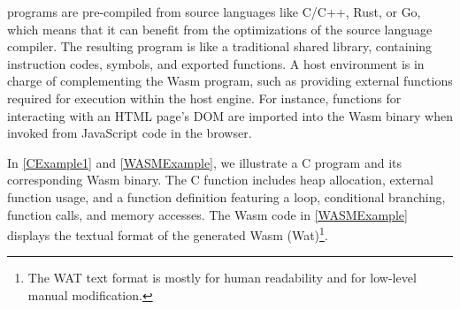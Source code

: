 

\Wasm programs are pre-compiled from source languages like C/C++, Rust, or Go, which means that it can benefit from the optimizations of the source language compiler.
The resulting \wasm program is like a traditional shared library, containing instruction codes, symbols, and exported functions. 
A host environment is in charge of complementing the Wasm program, such as providing external functions required for execution within the host engine. 
For instance, functions for interacting with an HTML page's DOM are imported into the Wasm binary when invoked from JavaScript code in the browser. 


In \autoref{CExample1} and \autoref{WASMExample}, we illustrate a C program and its corresponding Wasm binary. 
The C function includes heap allocation, external function usage, and a function definition featuring a loop, conditional branching, function calls, and memory accesses. 
The Wasm code in \autoref{WASMExample} displays the textual format of the generated Wasm (Wat)\footnote{The WAT text format is mostly for human readability and for low-level manual modification.}.



\begin{minipage}[hbtp]{0.9\textwidth}
    \begin{minipage}[t]{1.0\linewidth}
    
    \end{minipage}
\end{minipage}





\label{background:wasm:binary}

